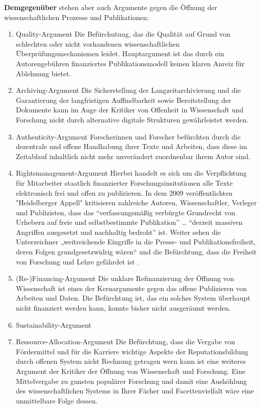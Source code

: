 \textbf{Demgegenüber} stehen aber auch Argumente gegen die Öffnung der wissenschaftlichen Prozesse und Publikationen:
\begin{enumerate}
\item 	Quality-Argument
Die Befürchutung, das die Qualität auf Grund von schlechten oder nicht vorhandenen wissenschaftlichen Überprüfungsmechanismen leidet. Hauptargument ist das durch ein Autorengebühren finanziertes Publikationsmodell keinen klaren Anreiz für Ablehnung bietet.
\item Archiving-Argument
Die Sicherstellung der Langzeitarchivierung und die Garantierung der langfristigen Auffindbarkeit sowie Bereitstellung der Dokumente kann im Auge der Kritiker von Offenheit in Wissenschaft und Forschung nicht durch alternative digitale Strukturen gewährleistet werden. 
\item Authenticity-Argument
Forscherinnen und Forscher befürchten durch die dezentrale und offene Handhabung ihrer Texte und Arbeiten, dass diese im Zeitablauf inhaltlich nicht mehr unverändert zuordnenbar ihrem Autor sind.
\item Rightsmanagement-Argument
Hierbei handelt es sich um die Verpflichtung für Mitarbeiter staatlich finanzierter Forschungsinsitutionen alle Texte elektronisch frei und offen zu publizieren. In dem 2009 veröffentlichten "Heidelberger Appell" \cite{faz_heidelberger_apell_2009} kritisieren zahlreiche Autoren, Wissenschaftler, Verleger und Publizisten, dass das “verfassungsmäßig verbürgte Grundrecht von Urhebern auf freie und selbstbestimmte Publikation” … “derzeit massiven Angriffen ausgesetzt und nachhaltig bedroht” ist. Weiter sehen die Unterzeichner „weitreichende Eingriffe in die Presse- und Publikationsfreiheit, deren Folgen grundgesetzwidrig wären“ \cite{ITK_2009} und die Befürchtung, dass die Freiheit von Forschung und Lehre gefährdet ist \cite{Jochum_2009}. 
\item (Re-)Financing-Argument
Die unklare Refinanzierung der Öffnung von Wissenschaft ist eines der Kernargumente gegen das offene Publizieren von Arbeiten und Daten. Die Befürchtung ist, das ein solches System überhaupt nicht finanziert werden kann, konnte bisher nicht ausgeräumt werden.
\item Sustainability-Argument
\item Ressource-Allocation-Argument
Die Befürchtung, dass die Vergabe von Fördermittel und für die Karriere wichtige Aspekte der Reputationsbildung durch offenen System nicht Rechnung getragen wern kann ist eine weiteres Argument der Kritiker der Öffnung von Wissenschaft und Forschung. Eine Mittelvergabe zu gunsten populärer Forschung und damit eine Aushöhlung des wissenschaftlichen Systems in Ihrer Fächer und Facettenvielfalt wäre eine unmittelbare Folge dessen.

\end{enumerate}
